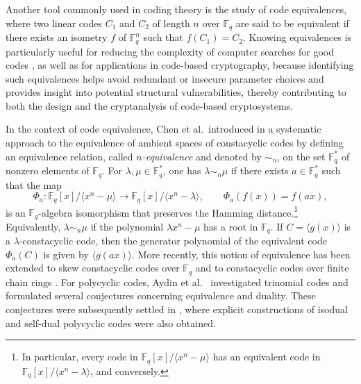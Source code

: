 \documentclass[12pt]{elsarticle}
\newcommand{\Fq}{\mathbb{F}_{q}}
\theoremstyle{break}
{\theorembodyfont{\upshape}
    \newtheorem{theorem}{Theorem}[section] %
    \newtheorem{lemma}[theorem]{Lemma} %
    \newtheorem{proposition}[theorem]{Proposition}
    \newtheorem{corollary}[theorem]{Corollary}
    \newtheorem{definition}[theorem]{Definition}
    \newtheorem{example}[theorem]{Example}
    \newtheorem{remark}[theorem]{Remark}
    \newtheorem{conjecture}[theorem]{Conjecture}
    \newtheorem*{proof}{{Proof}}
	\newtheorem*{notation}{Notation}
	\newtheorem*{main}{Cain Theorem}
	\newtheorem*{problem}{Problem}
}
\begin{document}
Another tool commonly used in coding theory is the study of code equivalences, where two linear codes $C_1$ and $C_2$ of length $n$ over $\Fq$ are said to be equivalent if there exists an isometry $f$ of $\Fq^n$ such that $f(C_1)=C_2$. Knowing equivalences is particularly useful for reducing the complexity of computer searches for good codes \cite{aydin2023new}, as well as for applications in code-based cryptography, 
because 
identifying such equivalences helps avoid redundant or insecure parameter choices and provides insight into potential structural vulnerabilities, thereby contributing to both the design and the cryptanalysis of code-based cryptosystems. %

In the context of code equivalence, Chen et al.\ introduced in \cite{Chen2014} a systematic approach to the equivalence of ambient spaces of constacyclic codes by defining an equivalence relation, called \textit{$n$-equivalence} and denoted by $\sim_n$, on the set $\Fq^\ast$ of nonzero elements of $\Fq$. For $\lambda,\mu \in \Fq^\ast$, one has $\lambda \sim_n \mu$ if there exists $a \in \Fq^\ast$ such that the map
$$
\Phi_a : \mathbb{F}_q[x]/\langle x^n-\mu\rangle \longrightarrow \mathbb{F}_q[x]/\langle x^n-\lambda\rangle,
\qquad
\Phi_a(f(x)) = f(ax),
$$
is an $\Fq$-algebra isomorphism that preserves the Hamming distance.\footnote{In particular, every code in $\mathbb{F}_q[x]/\langle x^n-\mu\rangle$ has an equivalent code in $\mathbb{F}_q[x]/\langle x^n-\lambda\rangle$, and conversely.}
Equivalently, $\lambda \sim_n \mu$ if the polynomial $\lambda x^n-\mu$ has a root in $\Fq$. 
If $C=\langle g(x)\rangle$ is a $\lambda$-constacyclic code, then the generator polynomial of the equivalent code $\Phi_a(C)$ is given by $\langle g(ax)\rangle$. More recently, this notion of equivalence has been extended to skew constacyclic codes over $\Fq$ \cite{Ouazzou2025} and to constacyclic codes over finite chain rings \cite{Chibloun2024}. 
For polycyclic codes, Aydin et al.\ \cite{Aydin2022} investigated trinomial codes and formulated several conjectures concerning equivalence and duality. These conjectures were subsequently settled in \cite{Shi2023}, where explicit constructions of isodual and self-dual polycyclic codes were also obtained.
\end{document}
